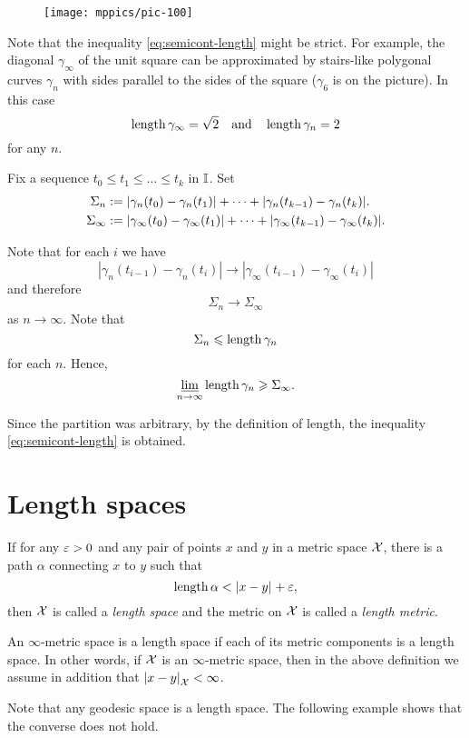 \begin{wrapfigure}{o}{20 mm}
\vskip-0mm
\centering
\texttt{[image: mppics/pic-100]}
\end{wrapfigure}

Note that the inequality \ref{eq:semicont-length} might be strict.
For example, the diagonal $\gamma_\infty$ of the unit square 
can be  approximated by stairs-like
polygonal curves $\gamma_n$
with sides parallel to the sides of the square ($\gamma_6$ is on the picture).
In this case
\[\mathop{\rm length}\nolimits\gamma_\infty=\sqrt{2}\quad
\text{and}\quad \mathop{\rm length}\nolimits\gamma_n=2\]
for any $n$.

Fix a sequence $t_0\le t_1\le\dots\le t_k$ in $\mathbb{I}$.
Set 
\begin{align*}\Sigma_n
&\mathrel{:=}
|\gamma_n(t_0)-\gamma_n(t_1)|+\dots+|\gamma_n(t_{k-1})-\gamma_n(t_k)|.
\\
\Sigma_\infty
&\mathrel{:=}
|\gamma_\infty(t_0)-\gamma_\infty(t_1)|+\dots+|\gamma_\infty(t_{k-1})-\gamma_\infty(t_k)|.
\end{align*}

Note that for each $i$ we have 
\[|\gamma_n(t_{i-1})-\gamma_n(t_i)|\to|\gamma_\infty(t_{i-1})-\gamma_\infty(t_i)|\]
and therefore
\[\Sigma_n\to \Sigma_\infty\] 
as $n\to\infty$.
Note that 
\[\Sigma_n\leqslant\mathop{\rm length}\nolimits\gamma_n\]
for each $n$.
Hence,
$$\varliminf_{n\to\infty} \mathop{\rm length}\nolimits\gamma_n \geqslant \Sigma_\infty.$$

Since the partition was arbitrary, by the definition of length, the inequality  \ref{eq:semicont-length} is obtained.
\qeds

\section{Length spaces}\label{sec:intrinsic}

If for any $\varepsilon>0$ and any pair of points $x$ and $y$ in a metric space $\mathcal{X}$, there is a path $\alpha$ connecting $x$ to $y$ such that
\[\length\alpha< \dist{x}{y}{}+\eps,\]
then $\mathcal{X}$ is called a \emph{length space} and the metric on $\mathcal{X}$ is called a \emph{length metric}.\label{page:length metric}

An $\infty$-metric space is a length space if each of its metric components is a length space.
In other words, if $\mathcal{X}$ is an $\infty$-metric space, 
then in the above definition we assume in addition that $\dist{x}{y}{\spc{X}}<\infty$.

Note that any geodesic space is a length space.
The following example shows that the converse does not hold.


